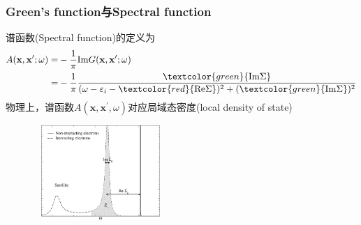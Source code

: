 \frame
{
	\frametitle{\textrm{Green's function}与\textrm{Spectral function}}
	谱函数\textrm{(Spectral function)}的定义为
	\begin{displaymath}
		\begin{aligned}
			A(\mathbf{x},\mathbf{x}^{\prime};\omega)=&-\dfrac1{\pi}\mathrm{Im}G(\mathbf{x},\mathbf{x}^{\prime};\omega)\\
			=&-\frac1{\pi}\frac{\textcolor{green}{\mathrm{Im}\Sigma}}{(\omega-\varepsilon_i-\textcolor{red}{\mathrm{Re}\Sigma})^2+(\textcolor{green}{\mathrm{Im}\Sigma})^2}
		\end{aligned}
	\end{displaymath}
	物理上，谱函数$A(\mathbf{x},\mathbf{x}^{\prime},\omega)$对应局域态密度\textrm{(local density of state)}
\begin{figure}[h!]
\centering
\includegraphics[height=1.4in,width=2.00in,viewport=0 0 1050 800,clip]{Figures/GW_spectral-function.png}
\label{Spectral_function}
\end{figure}
}

